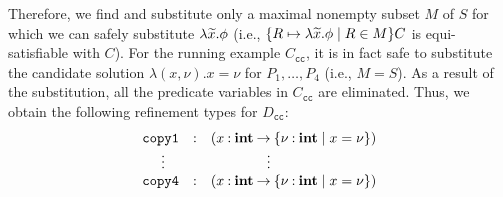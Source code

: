 Therefore, we find and substitute only a maximal nonempty subset \(M\)
of \(S\) for which we can safely substitute \(\lambda\widetilde{x}.\phi\) (i.e.,
\(\{{R \mapsto \lambda\widetilde{x}.\phi \mid R \in M}\}C\) is equi-satisfiable
with \(C\)).
%
%
For the running example \(C_{\texttt{cc}}\), it is in fact safe to
substitute the candidate solution \(\lambda (x,\nu). x=\nu\) for
\(P_1,\dots,P_4\) (i.e., \(M=S\)).  As a result of the substitution, all
the predicate variables in \(C_{\texttt{cc}}\) are eliminated.  Thus, we
obtain the following refinement types for \(D_{\texttt{cc}}\):
\[
\begin{array}{rcl}
\texttt{copy1}&\mathbin{:}&(x\mathbin{:}{\mathbf{int}}\mathbin{\rightarrow}{\{{\nu\mathbin{:}\mathbf{int} \mid x=\nu}\}}) \\
\vdots\quad &&\qquad\qquad \vdots \\
\texttt{copy4}&\mathbin{:}&(x\mathbin{:}{\mathbf{int}}\mathbin{\rightarrow}{\{{\nu\mathbin{:}\mathbf{int} \mid x=\nu}\}})
\end{array}
\]



%
